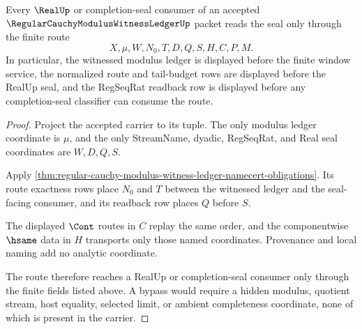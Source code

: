 \begin{theorem}
\label{thm:regular-cauchy-modulus-witness-ledger-seal-route}
Every $\RealUp$ or completion-seal consumer of an accepted $\RegularCauchyModulusWitnessLedgerUp$ packet reads the seal only through the finite route
$$
X,\mu,W,N_0,T,D,Q,S,H,C,P,M.
$$
In particular, the witnessed modulus ledger is displayed before the finite window service, the normalized route and tail-budget rows are displayed before the RealUp seal, and the RegSeqRat readback row is displayed before any completion-seal classifier can consume the route.
\end{theorem}
\begin{proof}
Project the accepted carrier to its tuple. The only modulus ledger coordinate is $\mu$, and the only StreamName, dyadic, RegSeqRat, and Real seal coordinates are $W,D,Q,S$.

Apply \autoref{thm:regular-cauchy-modulus-witness-ledger-namecert-obligations}. Its route exactness rows place $N_0$ and $T$ between the witnessed ledger and the seal-facing consumer, and its readback row places $Q$ before $S$.

The displayed $\Cont$ routes in $C$ replay the same order, and the componentwise $\hsame$ data in $H$ transports only those named coordinates. Provenance and local naming add no analytic coordinate.

The route therefore reaches a RealUp or completion-seal consumer only through the finite fields listed above. A bypass would require a hidden modulus, quotient stream, host equality, selected limit, or ambient completeness coordinate, none of which is present in the carrier.
\end{proof}

